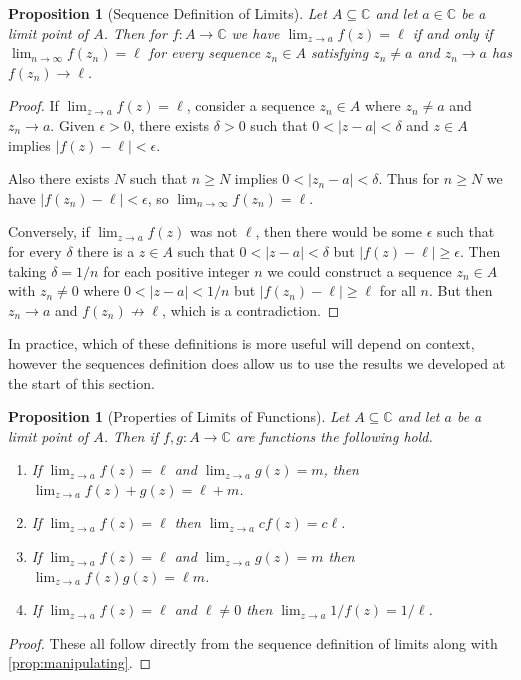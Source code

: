 \documentclass[11pt, a4paper]{article}
\newtheorem{proposition}[theorem]{Proposition}
\theoremstyle{definition}
\newcommand{\C}{\mathbb{C}}
\begin{document}
\begin{proposition}[Sequence Definition of Limits]
	Let $A \subseteq \C$ and let $a \in \C$ be a limit point of $A$. Then for $f:A \rightarrow \C$ we have $\displaystyle\lim_{z \to a} f(z) = \ell$ if and only if $\lim_{n \to \infty} f(z_n) = \ell$ for every sequence $z_n \in A$ satisfying $z_n \neq a$ and $z_n \rightarrow a$ has $f(z_n) \rightarrow \ell$.
\end{proposition}
\begin{proof}
If $\lim_{z \to a} f(z) = \ell$, consider a sequence $z_n \in A$ where $z_n \neq a$ and $z_n \rightarrow a$.
Given $\epsilon > 0$, there exists $\delta > 0$ such that $0 < |z - a| < \delta$ and $z \in A$ implies $|f(z) - \ell| < \epsilon$.

Also there exists $N$ such that $n \geq N$ implies $0 < |z_n - a| < \delta$. Thus for $n \geq N$ we have $|f(z_n) - \ell| < \epsilon$, so $\lim_{n \to \infty} f(z_n) = \ell$. 

Conversely, if $\lim_{z \to a} f(z)$ was not $\ell$, then there would be some $\epsilon$ such that for every $\delta$ there is a $z \in A$ such that $0 < |z - a| < \delta$ but $|f(z) - \ell| \geq \epsilon$. Then taking $\delta = 1/n$ for each positive integer $n$ we could construct a sequence $z_n \in A$ with $z_n \neq 0$ where $0 < |z - a| < 1/n$ but $|f(z_n) - \ell| \geq \ell$ for all $n$. But then $z_n \rightarrow a$ and $f(z_n) \not \rightarrow \ell$, which is a contradiction. 
\end{proof}


In practice, which of these definitions is more useful will depend on context, however the sequences definition does allow us to use the results we developed at the start of this section. 

\begin{proposition}[Properties of Limits of Functions]
	Let $A \subseteq \C$ and let $a$ be a limit point of $A$. Then if $f, g: A \rightarrow \C$ are functions the following hold.
	\begin{enumerate}[label=(\roman*)]
		\item If $\lim_{z \to a} f(z) = \ell$ and $\lim_{z \to a} g(z) = m$, then $\lim_{z \to a} f(z) + g(z) = \ell + m$.
		\item If $\lim_{z \to a} f(z) = \ell$ then $\lim_{z \to a} cf(z) = c\ell$.
		\item If $\lim_{z \to a} f(z) = \ell$ and $\lim_{z \to a} g(z) = m$ then $\lim_{z \to a} f(z)g(z) = \ell m$.
		\item If $\lim_{z \to a} f(z) = \ell$ and $\ell \neq 0$ then $\lim_{z \to a} 1/f(z) = 1/\ell$.
	\end{enumerate}
\end{proposition}
\begin{proof}
	These all follow directly from the sequence definition of limits along with \autoref{prop:manipulating}.
\end{proof}
\end{document}
